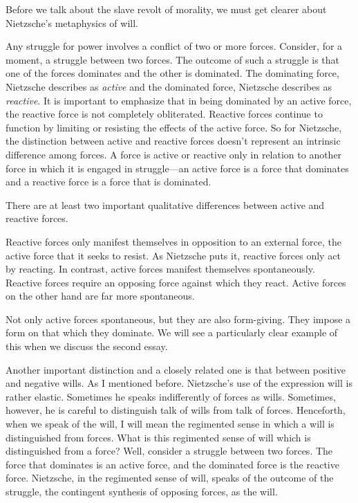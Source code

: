 Before we talk about the slave revolt of morality, we must get clearer about Nietzsche's metaphysics of will.

Any struggle for power involves a conflict of two or more forces. Consider, for a moment, a struggle between two forces. The outcome of such a struggle is that one of the forces dominates and the other is dominated. The dominating force, Nietzsche describes as \emph{active} and the dominated force, Nietzsche describes as \emph{reactive}. It is important to emphasize that in being dominated by an active force, the reactive force is not completely obliterated. Reactive forces continue to function by limiting or resisting the effects of the active force. So for Nietzsche, the distinction between active and reactive forces doesn't represent an intrinsic difference among forces. A force is active or reactive only in relation to another force in which it is engaged in struggle---an active force is a force that dominates and a reactive force is a force that is dominated.

There are at least two important qualitative differences between active and reactive forces. 

Reactive forces only manifest themselves in opposition to an external force, the active force that it seeks to resist. As Nietzsche puts it, reactive forces only act by reacting. In contrast, active forces manifest themselves spontaneously. Reactive forces require an opposing force against which they react. Active forces on the other hand are far more spontaneous.

Not only active forces spontaneous, but they are also form-giving. They impose a form on that which they dominate. We will see a particularly clear example of this when we discuss the second essay. \change

Another important distinction and a closely related one is that between positive and negative wills. As I mentioned before. Nietzsche's use of the expression will is rather elastic. Sometimes he speaks indifferently of forces as wills. Sometimes, however, he is careful to distinguish talk of wills from talk of forces. Henceforth, when we speak of the will, I will mean the regimented sense in which a will is distinguished from forces. What is this regimented sense of will which is distinguished from a force? Well, consider a struggle between two forces. The force that dominates is an active force, and the dominated force is the reactive force. Nietzsche, in the regimented sense of will, speaks of the outcome of the struggle, the contingent synthesis of opposing forces, as the will.

